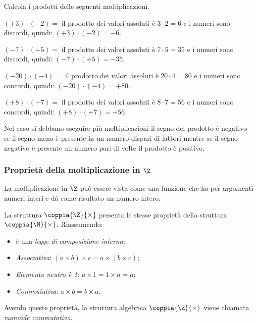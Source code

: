 \begin{esempio}{}{}
Calcola i prodotti delle seguenti moltiplicazioni.
\begin{enumeratea}
\item \((+3) \cdot (-2)=\) 
il prodotto dei valori assoluti è \(3 \cdot 2 = 6\) 
e i numeri sono discordi, quindi: \((+3) \cdot (-2) = -6\).
\item \((-7) \cdot (+5) =\) 
il prodotto dei valori assoluti è \(7 \cdot 5 = 35\) 
e i numeri sono discordi, quindi: \((-7) \cdot (+5) = -35\).
\item \((-20) \cdot (-4) =\) 
il prodotto dei valori assoluti è \(20 \cdot 4 = 80\) 
e i numeri sono concordi, quindi: \((-20) \cdot (-4) = +80\).
\item \((+8) \cdot (+7) =\) 
il prodotto dei valori assoluti è \(8 \cdot 7 = 56\) 
e i numeri sono concordi, quindi: \((+8) \cdot (+7) = +56\).
\end{enumeratea}
\end{esempio}


Nel caso si debbano eseguire più moltiplicazioni il segno del prodotto è 
negativo se il segno meno è presente in un numero dispari di fattori 
mentre se il segno negativo è presente un numero pari di volte il prodotto 
è positivo.

\subsubsection{Proprietà della moltiplicazione in \(\Z\)}

La moltiplicazione in \(\Z\) può essere vista come una funzione che ha per 
argomenti numeri interi e dà come risultato un numero intero.

La struttura \(\coppia{\Z}{\times}\) presenta le stesse proprietà della 
struttura \(\coppia{\N}{\times}\).
Riassumendo:
\begin{itemize} [noitemsep]
 \item è una \emph{legge di composizione interna};
 \item \emph{Associativa}: \quad 
 \((a \times b) \times c = a \times (b \times c)\);
 \item \emph{Elemento neutro è 1}: \quad \(a \times 1 = 1 \times a = a\);
 \item \emph{Commutativa}: \quad \(a \times b = b \times a\).
\end{itemize}
Avendo queste proprietà, la struttura algebrica \(\coppia{\Z}{\times}\) viene 
chiamata \emph{monoide commutativo}.

